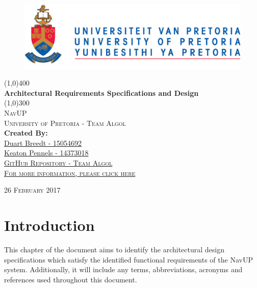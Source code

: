 \documentclass{article}
\begin{document}
	\begin{titlepage}
		\begin{center}
			\begin{figure}
				\includegraphics[width=\linewidth]{logo.jpg}	
			\end{figure}
			\line(1,0){400}\\
			[6mm]
			\huge{
				\bfseries Architectural Requirements Specifications and Design
			}\\
			[2mm]
			\line(1,0){300}\\
			[15mm]
			\textsc{\large NavUP}\\
			[7.5mm]
			\textsc{\large University of Pretoria - Team Algol}\\
			[20mm]
			\large{\textbf{Created By:}}\\
			[2mm]
			\href{https://github.com/DuartBreedt}{Duart Breedt - 15054692}\\
			\href{https://github.com/KeatonPennels}{Keaton Pennels - 14373018}\\
			[5mm]
			
		
		
			\href{https://github.com/Chris19951225/COS-301-Team-Algol}{\textsc{\Large GitHub Repository - Team Algol}}\\[2mm]
			\href{https://github.com/Chris19951225/COS-301-Team-Algol}{\textsc{For more information, please click here}}\\[2mm]
		\end{center}
		\begin{flushright}
			\textsc{\large 26 February 2017}
		\end{flushright}
	\end{titlepage}

	\cleardoublepage
	\thispagestyle{empty}
	\tableofcontents
	\cleardoublepage

	\thispagestyle{empty}
	\listoffigures
	\cleardoublepage
	\setcounter{page}{1}
	
	
	\section{Introduction}\label{sec:intro}
		This chapter of the document aims to identify the architectural design specifications which satisfy the identified functional requirements of the NavUP system. Additionally, it will include any terms, abbreviations, acronyms and references used throughout this document.
	
\end{document}
